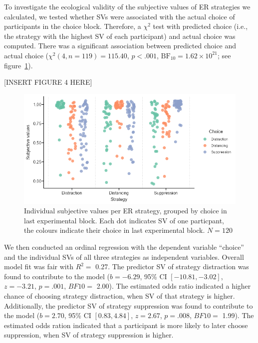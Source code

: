 \documentclass[
  man,floatsintext]{apa6}
\begin{document}
To investigate the ecological validity of the subjective values of ER strategies we calculated, we tested whether SVs were associated with the actual choice of participants in the choice block.
Therefore, a \(\chi^{2}\) test with predicted choice (i.e., the strategy with the highest SV of each participant) and actual choice was computed.
There was a significant association between predicted choice and actual choice (\(\chi^2(4, n = 119) = 115.40\), \(p < .001\), \(\mathrm{BF}_{\textrm{10}} = 1.62 \times 10^{21}\); see figure~\ref{fig:FigSVChoice}).

{[}INSERT FIGURE 4 HERE{]}

\begin{figure}[H]
\includegraphics[width=\textwidth]{figures/FigSVChoice} \caption{Individual subjective values per ER strategy, grouped by choice in last experimental block. Each dot indicates SV of one particpant, the colours indicate their choice in last experimental block. $N=120$}\label{fig:FigSVChoice}
\end{figure}

We then conducted an ordinal regression with the dependent variable ``choice'' and the individual SVs of all three strategies as independent variables.
Overall model fit was fair with \(R^{2}=\) 0.27.
The predictor SV of strategy distraction was found to contribute to the model (\(b = -6.29\), 95\% CI \([-10.81, -3.02]\), \(z = -3.21\), \(p = .001\), \(BF10=\) 2.00).
The estimated odds ratio indicated a higher chance of choosing strategy distraction, when SV of that strategy is higher.
Additionally, the predictor SV of strategy suppression was found to contribute to the model (\(b = 2.70\), 95\% CI \([0.83, 4.84]\), \(z = 2.67\), \(p = .008\), \(BF10=\) 1.99).
The estimated odds ration indicated that a participant is more likely to later choose suppression, when SV of strategy suppression is higher.
\end{document}
